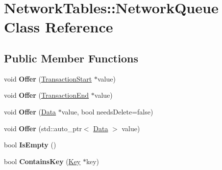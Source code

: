 \hypertarget{classNetworkTables_1_1NetworkQueue}{
\section{NetworkTables::NetworkQueue Class Reference}
\label{classNetworkTables_1_1NetworkQueue}
}
\subsection*{Public Member Functions}
\begin{DoxyCompactItemize}
\item 
\hypertarget{classNetworkTables_1_1NetworkQueue_a144e39d333a82b064be0ae4bda99bfe9}{
void {\bfseries Offer} (\hyperlink{classNetworkTables_1_1TransactionStart}{TransactionStart} $\ast$value)}
\label{classNetworkTables_1_1NetworkQueue_a144e39d333a82b064be0ae4bda99bfe9}

\item 
\hypertarget{classNetworkTables_1_1NetworkQueue_ad52d864b377081e8b4876677d811f679}{
void {\bfseries Offer} (\hyperlink{classNetworkTables_1_1TransactionEnd}{TransactionEnd} $\ast$value)}
\label{classNetworkTables_1_1NetworkQueue_ad52d864b377081e8b4876677d811f679}

\item 
\hypertarget{classNetworkTables_1_1NetworkQueue_a86e1ec86c1a55d14a6ec4b61dc54b482}{
void {\bfseries Offer} (\hyperlink{classNetworkTables_1_1Data}{Data} $\ast$value, bool needsDelete=false)}
\label{classNetworkTables_1_1NetworkQueue_a86e1ec86c1a55d14a6ec4b61dc54b482}

\item 
\hypertarget{classNetworkTables_1_1NetworkQueue_a9e61387f0284c84fae29a20e8b2ca132}{
void {\bfseries Offer} (std::auto\_\-ptr$<$ \hyperlink{classNetworkTables_1_1Data}{Data} $>$ value)}
\label{classNetworkTables_1_1NetworkQueue_a9e61387f0284c84fae29a20e8b2ca132}

\item 
\hypertarget{classNetworkTables_1_1NetworkQueue_ad4576ae84960d51d9ded7d585e090fcf}{
bool {\bfseries IsEmpty} ()}
\label{classNetworkTables_1_1NetworkQueue_ad4576ae84960d51d9ded7d585e090fcf}

\item 
\hypertarget{classNetworkTables_1_1NetworkQueue_ad7e2200c789e5f72ecbeb1c4f63cbf9c}{
bool {\bfseries ContainsKey} (\hyperlink{classNetworkTables_1_1Key}{Key} $\ast$key)}
\label{classNetworkTables_1_1NetworkQueue_ad7e2200c789e5f72ecbeb1c4f63cbf9c}


\end{DoxyCompactItemize}
